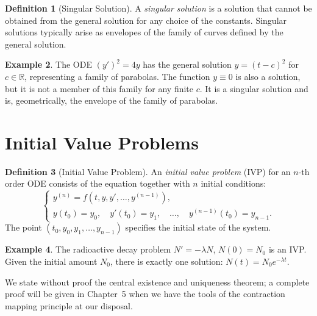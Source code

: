 \documentclass[12pt,a4paper,openany]{book}
\theoremstyle{definition}
\newtheorem{definition}{Definition}[chapter]
\newtheorem{example}[definition]{Example}
\theoremstyle{plain}
\theoremstyle{remark}
\newcommand{\R}{\mathbb{R}}
\begin{document}
\begin{definition}[Singular Solution]
\label{def:singular-solution}
A \emph{singular solution} is a solution that cannot be obtained from the general solution for any choice of the constants. Singular solutions typically arise as envelopes of the family of curves defined by the general solution.
\end{definition}

\begin{example}
\label{ex:singular}
The ODE $(y')^2 = 4y$ has the general solution $y = (t-c)^2$ for $c\in\R$, representing a family of parabolas. The function $y\equiv 0$ is also a solution, but it is not a member of this family for any finite $c$. It is a singular solution and is, geometrically, the envelope of the family of parabolas.
\end{example}

\section{Initial Value Problems}
\label{sec:ivp}

\begin{definition}[Initial Value Problem]
\label{def:ivp}
An \emph{initial value problem} (IVP) for an $n$-th order ODE consists of the equation together with $n$ initial conditions:
\begin{equation}\label{eq:ivp}
\begin{cases}
  y^{(n)} = f(t, y, y', \ldots, y^{(n-1)}), \\[4pt]
  y(t_0) = y_0,\quad y'(t_0)=y_1,\quad \ldots,\quad y^{(n-1)}(t_0) = y_{n-1}.
\end{cases}
\end{equation}
The point $(t_0, y_0, y_1, \ldots, y_{n-1})$ specifies the initial state of the system.
\end{definition}

\begin{example}
\label{ex:ivp-decay}
The radioactive decay problem $N' = -\lambda N$, $N(0) = N_0$ is an IVP. Given the initial amount $N_0$, there is exactly one solution: $N(t) = N_0 e^{-\lambda t}$.
\end{example}

We state without proof the central existence and uniqueness theorem; a complete proof will be given in Chapter~5 when we have the tools of the contraction mapping principle at our disposal.
\end{document}
